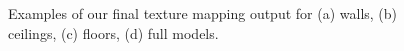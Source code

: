 \documentclass[]{spie}  %
\begin{document}
\begin{figure}

  \centering \subfloat[][]{ }
  \caption{Examples of our final texture mapping output for (a) walls,
    (b) ceilings, (c) floors, (d) full models.}
  \label{fig:results}
\end{figure}



\end{document}
